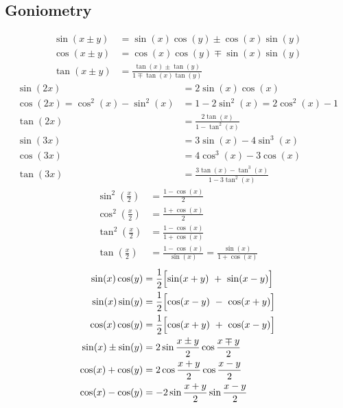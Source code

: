 \subsection{Goniometry}
\begin{align*}
    \sin(x\pm y) & =\sin(x)\cos(y)\pm\cos(x)\sin(y)              \\
    \cos(x\pm y) & =\cos(x)\cos(y)\mp\sin(x)\sin(y)              \\
    \tan(x\pm y) & =\frac{\tan(x)\pm\tan(y)}{1\mp\tan(x)\tan(y)}
\end{align*}
\begin{align*}
    \sin(2x)                     & =2\sin(x)\cos(x)                         \\
    \cos(2x)=\cos^2(x)-\sin^2(x) & =1-2\sin^2(x)=2\cos^2(x)-1               \\
    \tan(2x)                     & =\frac{2\tan(x)}{1-\tan^2(x)}            \\
    \sin(3x)                     & =3\sin(x)-4\sin^3(x)                     \\
    \cos(3x)                     & =4\cos^3(x)-3\cos(x)                     \\
    \tan(3x)                     & =\frac{3\tan(x)-\tan^3(x)}{1-3\tan^2(x)}
\end{align*}
\begin{align*}
    \sin^2\left(\frac x2\right)    & =\frac{1-\cos(x)}{2}                                 \\
    \cos^2\left(\frac x2\right)    & =\frac{1+\cos(x)}{2}                                 \\
    \tan^2\left(\frac{x}{2}\right) & =\frac{1-\cos(x)}{1+\cos(x)}                         \\
    \tan\left(\frac x2\right)      & =\frac{1-\cos(x)}{\sin(x)}=\frac{\sin(x)}{1+\cos(x)}
\end{align*}
\begin{align*}
    \sin(x)\cos(y)    & =\frac12\Bigl[\sin(x+y)~+~\sin(x-y)\Bigr]   \\
    \sin(x)\sin(y)    & =\frac12\Bigl[\cos(x-y)~-~\cos(x+y)\Bigr]   \\
    \cos(x)\cos(y)    & =\frac12\Bigl[\cos(x+y)~+~\cos(x-y)\Bigr]   \\
    \sin(x)\pm\sin(y) & =2\sin\frac{x\pm y}{2}\cos\frac{x \mp y}{2} \\
    \cos(x)+\cos(y)   & =2\cos\frac{x+y}{2}\cos\frac{x-y}{2}        \\
    \cos(x)-\cos(y)   & =-2\sin\frac{x+y}{2}\sin\frac{x-y}{2}
\end{align*}


